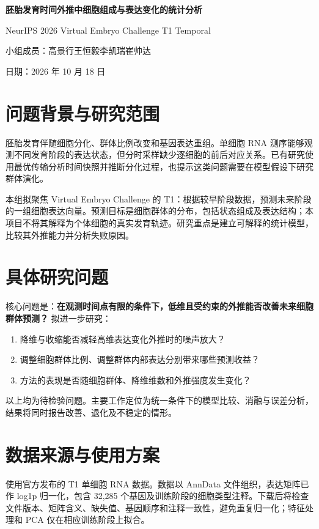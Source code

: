 \documentclass[UTF8,zihao=-4,fontset=none,a4paper]{ctexart}
\begin{document}
\begin{center}
{\bfseries 胚胎发育时间外推中细胞组成与表达变化的统计分析\par}
\vspace{5pt}
{\normalsize NeurIPS 2026 Virtual Embryo Challenge T1 Temporal\par}
\vspace{4pt}
{\small 小组成员：高景行\quad 王恒毅\quad 李凯瑞\quad 崔帅达\par}
\vspace{2pt}
{\small 日期：2026 年 10 月 18 日}
\end{center}
\vspace{-5pt}

\section{问题背景与研究范围}
胚胎发育伴随细胞分化、群体比例改变和基因表达重组。单细胞 RNA 测序能够观测不同发育阶段的表达状态，但分时采样缺少逐细胞的前后对应关系。已有研究使用最优传输分析时间快照并推断分化过程\cite{schiebinger}，也提示这类问题需要在模型假设下研究群体演化。

本组拟聚焦 Virtual Embryo Challenge 的 T1：根据较早阶段数据，预测未来阶段的一组细胞表达向量\cite{task}。预测目标是细胞群体的分布，包括状态组成及表达结构；本项目不将其解释为个体细胞的真实发育轨迹。研究重点是建立可解释的统计模型，比较其外推能力并分析失败原因。

\section{具体研究问题}
核心问题是：\textbf{在观测时间点有限的条件下，低维且受约束的外推能否改善未来细胞群体预测？} 拟进一步研究：
\begin{enumerate}[label=（\arabic*）]
  \item 降维与收缩能否减轻高维表达变化外推时的噪声放大？
  \item 调整细胞群体比例、调整群体内部表达分别带来哪些预测收益？
  \item 方法的表现是否随细胞群体、降维维数和外推强度发生变化？
\end{enumerate}
以上均为待检验问题。主要工作定位为统一条件下的模型比较、消融与误差分析，结果将同时报告改善、退化及不稳定的情形。

\section{数据来源与使用方案}
使用官方发布的 T1 单细胞 RNA 数据。数据以 AnnData 文件组织，表达矩阵已作 log1p 归一化，包含 32,285 个基因及训练阶段的细胞类型注释\cite{data}。下载后将检查文件版本、矩阵含义、缺失值、基因顺序和注释一致性，避免重复归一化；特征处理和 PCA 仅在相应训练阶段上拟合。
\end{document}
